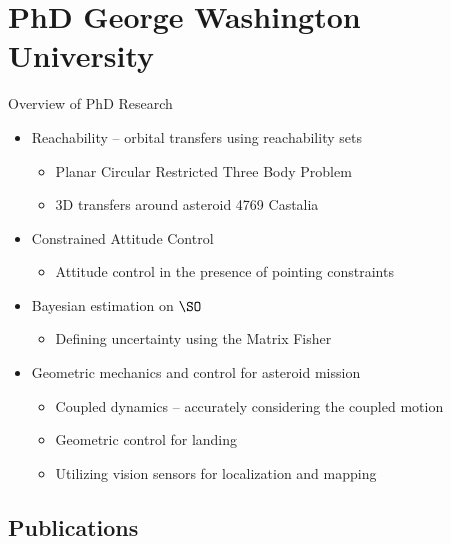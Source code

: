 
\section[PhD Research]{PhD George Washington University}

\begin{frame}{Overview of PhD Research}
    \begin{itemize}
        \item Reachability -- orbital transfers using reachability sets
            \begin{itemize}
                \item Planar Circular Restricted Three Body Problem
                \item 3D transfers around asteroid 4769 Castalia 
            \end{itemize}
        \pause
        \item Constrained Attitude Control
            \begin{itemize}
                \item Attitude control in the presence of pointing constraints
            \end{itemize}
        \item Bayesian estimation on \( \SO \)
            \begin{itemize}
                \item Defining uncertainty using the Matrix Fisher
            \end{itemize}
        \pause
        \item Geometric mechanics and control for asteroid mission
            \begin{itemize}
                \item Coupled dynamics -- accurately considering the coupled motion
                \item Geometric control for landing 
                \item Utilizing vision sensors for localization and mapping
            \end{itemize}
    \end{itemize}
\end{frame}


\subsection[Publications]{ Publications }

